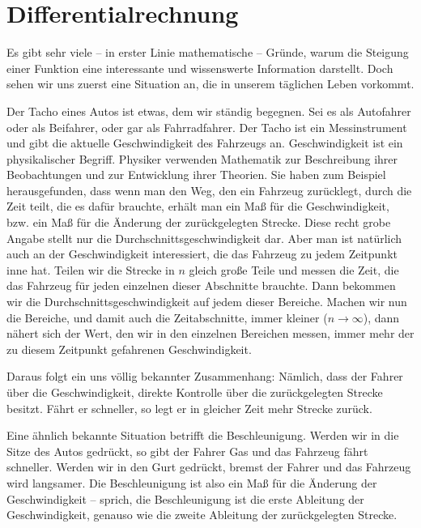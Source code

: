 

\chapter{Differentialrechnung}\label{chap:diff}

Es gibt sehr viele -- in erster Linie mathematische -- Gründe, warum die Steigung einer Funktion eine interessante und wissenswerte Information darstellt. Doch sehen wir uns zuerst eine Situation an, die in unserem täglichen Leben vorkommt.

Der Tacho eines Autos ist etwas, dem wir ständig begegnen. Sei es als Autofahrer oder als Beifahrer, oder gar als Fahrradfahrer. Der Tacho ist ein Messinstrument und gibt die aktuelle Geschwindigkeit des Fahrzeugs an. Geschwindigkeit ist ein physikalischer Begriff. Physiker verwenden Mathematik zur Beschreibung ihrer Beobachtungen und zur Entwicklung ihrer Theorien. Sie haben zum Beispiel herausgefunden, dass wenn man den Weg, den ein Fahrzeug zurücklegt, durch die Zeit teilt, die es dafür brauchte, erhält man ein Maß für die Geschwindigkeit, bzw. ein Maß für die Änderung der zurückgelegten Strecke. Diese recht grobe Angabe stellt nur die Durchschnittsgeschwindigkeit dar. Aber man ist natürlich auch an der Geschwindigkeit interessiert, die das Fahrzeug zu jedem Zeitpunkt inne hat. Teilen wir die Strecke in $n$ gleich große Teile und messen die Zeit, die das Fahrzeug für jeden einzelnen dieser Abschnitte brauchte. Dann bekommen wir die Durchschnittsgeschwindigkeit auf jedem dieser Bereiche. Machen wir nun die Bereiche, und damit auch die Zeitabschnitte, immer kleiner ($n \rightarrow \infty$), dann nähert sich der Wert, den wir in den einzelnen Bereichen messen, immer mehr der zu diesem Zeitpunkt gefahrenen Geschwindigkeit. 

Daraus folgt ein uns völlig bekannter Zusammenhang: Nämlich, dass der Fahrer über die Geschwindigkeit, direkte Kontrolle über die zurückgelegten Strecke besitzt. Fährt er schneller, so legt er in gleicher Zeit mehr Strecke zurück. 

Eine ähnlich bekannte Situation betrifft die Beschleunigung. Werden wir in die Sitze des Autos gedrückt, so gibt der Fahrer Gas und das Fahrzeug fährt schneller. Werden wir in den Gurt gedrückt, bremst der Fahrer und das Fahrzeug wird langsamer. Die Beschleunigung ist also ein Maß für die Änderung der Geschwindigkeit -- sprich, die Beschleunigung ist die erste Ableitung der Geschwindigkeit, genauso wie die zweite Ableitung der zurückgelegten Strecke.

